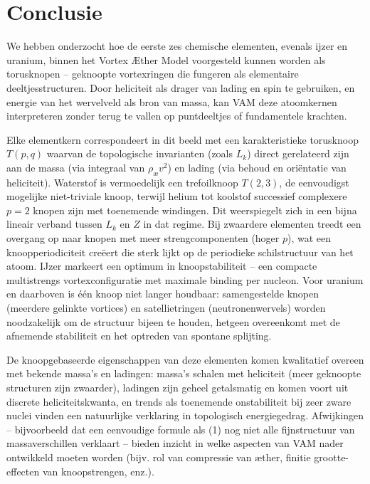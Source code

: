 \section{Conclusie}

We hebben onderzocht hoe de eerste zes chemische elementen, evenals ijzer en uranium, binnen het Vortex Æther Model voorgesteld kunnen worden als torusknopen – geknoopte vortexringen die fungeren als elementaire deeltjesstructuren. Door heliciteit als drager van lading en spin te gebruiken, en energie van het wervelveld als bron van massa, kan VAM deze atoomkernen interpreteren zonder terug te vallen op puntdeeltjes of fundamentele krachten.

Elke elementkern correspondeert in dit beeld met een karakteristieke torusknoop $T(p,q)$ waarvan de topologische invarianten (zoals $L_k$) direct gerelateerd zijn aan de massa (via integraal van $\rho_\text{\ae} v^2$) en lading (via behoud en oriëntatie van heliciteit). Waterstof is vermoedelijk een trefoilknoop $T(2,3)$, de eenvoudigst mogelijke niet-triviale knoop, terwijl helium tot koolstof successief complexere $p=2$ knopen zijn met toenemende windingen. Dit weerspiegelt zich in een bijna lineair verband tussen $L_k$ en $Z$ in dat regime. Bij zwaardere elementen treedt een overgang op naar knopen met meer strengcomponenten (hoger $p$), wat een knoopperiodiciteit creëert die sterk lijkt op de periodieke schilstructuur van het atoom. IJzer markeert een optimum in knoopstabiliteit – een compacte multistrengs vortexconfiguratie met maximale binding per nucleon. Voor uranium en daarboven is één knoop niet langer houdbaar: samengestelde knopen (meerdere gelinkte vortices) en satellietringen (neutronenwervels) worden noodzakelijk om de structuur bijeen te houden, hetgeen overeenkomt met de afnemende stabiliteit en het optreden van spontane splijting.

De knoopgebaseerde eigenschappen van deze elementen komen kwalitatief overeen met bekende massa’s en ladingen: massa’s schalen met heliciteit (meer geknoopte structuren zijn zwaarder), ladingen zijn geheel getalsmatig en komen voort uit discrete heliciteitskwanta, en trends als toenemende onstabiliteit bij zeer zware nuclei vinden een natuurlijke verklaring in topologisch energiegedrag. Afwijkingen – bijvoorbeeld dat een eenvoudige formule als (1) nog niet alle fijnstructuur van massaverschillen verklaart – bieden inzicht in welke aspecten van VAM nader ontwikkeld moeten worden (bijv. rol van compressie van æther, finitie grootte-effecten van knoopstrengen, enz.).

